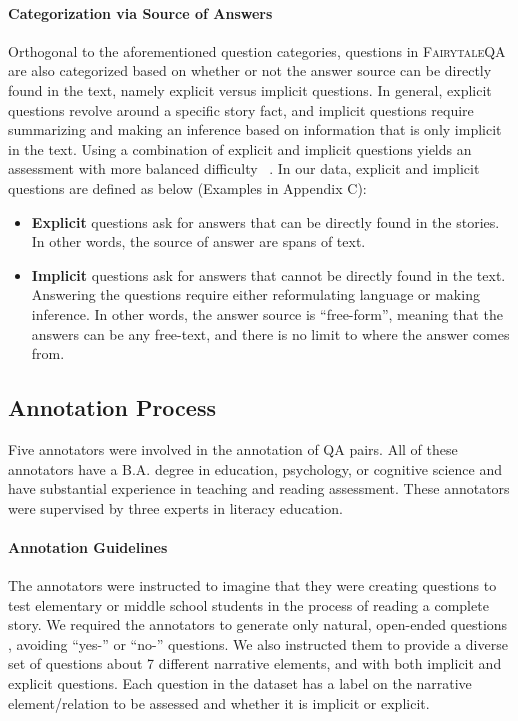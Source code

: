 \documentclass[11pt]{article}
\newcommand{\datasetname}{\textsc{FairytaleQA}\xspace}
\begin{document}
\paragraph{Categorization via Source of Answers}
Orthogonal to the aforementioned question categories, questions in \datasetname are also categorized based on whether or not the answer source can be directly found in the text, namely explicit versus implicit questions. In general, explicit questions revolve around a specific story fact, and implicit questions require summarizing and making an inference based on information that is only implicit in the text. Using a combination of explicit and implicit questions yields an assessment with more balanced difficulty ~\cite{raphael1986teaching, zucker2010preschool}. In our data, explicit and implicit questions are defined as below (Examples in Appendix C): 

\begin{itemize}[nosep, leftmargin=1em,labelwidth=*,align=left]
  \item \textbf{Explicit} questions ask for answers that can be directly found in the stories. In other words, the source of answer are spans of text. 
   
  \item \textbf{Implicit} questions ask for answers that cannot be directly found in the text. Answering the questions require either reformulating language or making inference. In other words, the answer source is ``free-form'', meaning that the answers can be any free-text, and there is no limit to where the answer comes from. 


 
\end{itemize}


\subsection{Annotation Process}
Five annotators were involved in the annotation of QA pairs. All of these annotators have a B.A. degree in education, psychology, or cognitive science and have substantial experience in teaching and reading assessment. These annotators were supervised by three experts in literacy education. 

\paragraph{Annotation Guidelines}
The annotators were instructed to imagine that they were creating questions to test elementary or middle school students in the process of reading a complete story. We required the annotators to generate only natural, open-ended questions 
, avoiding ``yes-'' or ``no-'' questions. We also instructed them to provide a diverse set of questions about 7 different narrative elements, and with both implicit and explicit questions. Each question in the dataset has a label on the narrative element/relation to be assessed and whether it is implicit or explicit.  
\end{document}
